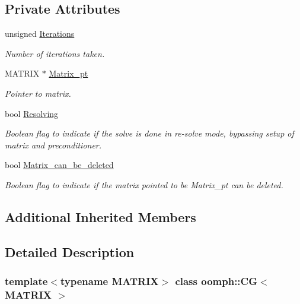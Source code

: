 \subsection*{Private Attributes}
\begin{DoxyCompactItemize}
\item 
unsigned \hyperlink{classoomph_1_1CG_a887d842b056091bcb8093f43a262d620}{Iterations}
\begin{DoxyCompactList}\small\item\em Number of iterations taken. \end{DoxyCompactList}\item 
M\+A\+T\+R\+IX $\ast$ \hyperlink{classoomph_1_1CG_a988bdcfb0c84bc14369092547afa4938}{Matrix\+\_\+pt}
\begin{DoxyCompactList}\small\item\em Pointer to matrix. \end{DoxyCompactList}\item 
bool \hyperlink{classoomph_1_1CG_abb0446c6424e75adff3b220acb61159e}{Resolving}
\begin{DoxyCompactList}\small\item\em Boolean flag to indicate if the solve is done in re-\/solve mode, bypassing setup of matrix and preconditioner. \end{DoxyCompactList}\item 
bool \hyperlink{classoomph_1_1CG_aabb4b15b969d9e061411547b23bd4d9a}{Matrix\+\_\+can\+\_\+be\+\_\+deleted}
\begin{DoxyCompactList}\small\item\em Boolean flag to indicate if the matrix pointed to be Matrix\+\_\+pt can be deleted. \end{DoxyCompactList}\end{DoxyCompactItemize}
\subsection*{Additional Inherited Members}


\subsection{Detailed Description}
\subsubsection*{template$<$typename M\+A\+T\+R\+IX$>$\newline
class oomph\+::\+C\+G$<$ M\+A\+T\+R\+I\+X $>$}

